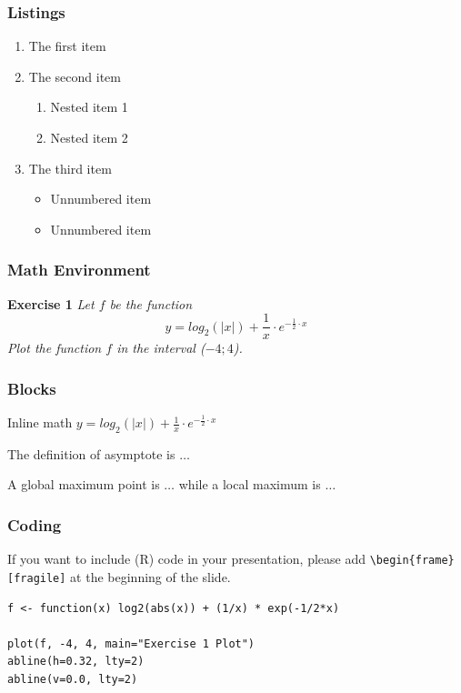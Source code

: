 \documentclass[11pt, xcolor=dvipsnames]{beamer}
\begin{document}
\begin{frame}
\frametitle{Listings}
\begin{enumerate}
	\item The first item 
	\item The second item
	\begin{enumerate}
		\item Nested item 1
		\item Nested item 2
	\end{enumerate}
	\item The third item
	\begin{itemize}
		\item Unnumbered item
		\item Unnumbered item	
	\end{itemize}
\end{enumerate}
\end{frame}

\begin{frame}
\frametitle{Math Environment}
\textbf{Exercise 1}
\textit{Let $f$ be the function}
	\begin{equation}
		y = log_2(|x|) + \frac{1}{x} \cdot e^{-\frac{1}{2} \cdot x}
	\label{equation-1}
	\end{equation}
	\textit{Plot the function $f$ in the interval ($-4; 4$).}
\end{frame}

\begin{frame}[fragile]
\frametitle{Blocks}
\begin{Example}
	Inline math $y = log_2(|x|) + \frac{1}{x} \cdot e^{-\frac{1}{2} \cdot x}$
\end{Example}
\pause
\begin{definition}
The definition of asymptote is $\hdots$
\end{definition}
\pause
\begin{theorem}
	A global maximum point is $\hdots$ while a local maximum is $\hdots$
\end{theorem}
\end{frame}

\begin{frame}[fragile]
\frametitle{Coding}
If you want to include (\textsf{R}) code in your presentation, please add \texttt{\textbackslash begin\{frame\}[fragile]} at the beginning of the slide. \bigskip
\begin{lstlisting}
f <- function(x) log2(abs(x)) + (1/x) * exp(-1/2*x)

plot(f, -4, 4, main="Exercise 1 Plot")
abline(h=0.32, lty=2)
abline(v=0.0, lty=2)
\end{lstlisting} 
\end{frame}
\end{document}
